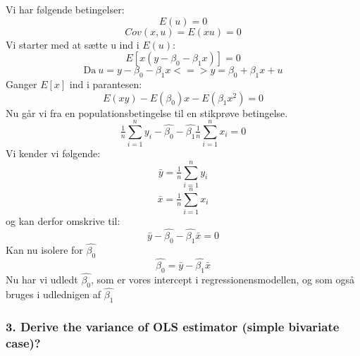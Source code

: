 \documentclass[
  10pt,
]{article}
\begin{document}
\leavevmode

Vi har følgende betingelser: \[ E(u)=0\] \[ Cov(x,u)=E(xu)=0\] Vi
starter med at sætte u ind i \(E(u)\): \[E[x(y-\beta_0-\beta_1x)]=0\]
\[\text{Da}\ u=y-\beta_0-\beta_1x <=> y=\beta_0+\beta_1x+u  \] Ganger
\(E[x]\) ind i parantesen: \[E(xy)-E(\beta_0)x-E(\beta_1x^2)=0 \] Nu går
vi fra en populationsbetingelse til en stikprøve betingelse.
\[\tfrac{1}{n}\sum\limits_{i=1}^n y_i-\hat{\beta_0}-\hat{\beta_1}\tfrac{1}{n}\sum\limits_{i=1}^n x_i=0 \]
Vi kender vi følgende:
\[ \bar{y} = \tfrac{1}{n}\sum\limits_{i=1}^n y_i \]
\[ \bar{x} = \tfrac{1}{n}\sum\limits_{i=1}^n x_i \] og kan derfor
omskrive til: \[ \bar{y}- \hat{\beta_0}-\hat{\beta_1}\bar{x}=0 \] Kan nu
isolere for \(\hat{\beta_0}\)
\[ \hat{\beta_0} = \bar{y}-\hat{\beta_1}\bar{x} \] Nu har vi udledt
\(\hat{\beta_0}\), som er vores intercept i regressionensmodellen, og
som også bruges i udlednigen af \(\hat{\beta_1}\) \newpage

\hypertarget{derive-the-variance-of-ols-estimator-simple-bivariate-case}{%
\subsubsection{3. Derive the variance of OLS estimator (simple bivariate
case)?}\label{derive-the-variance-of-ols-estimator-simple-bivariate-case}}

\leavevmode
\end{document}
